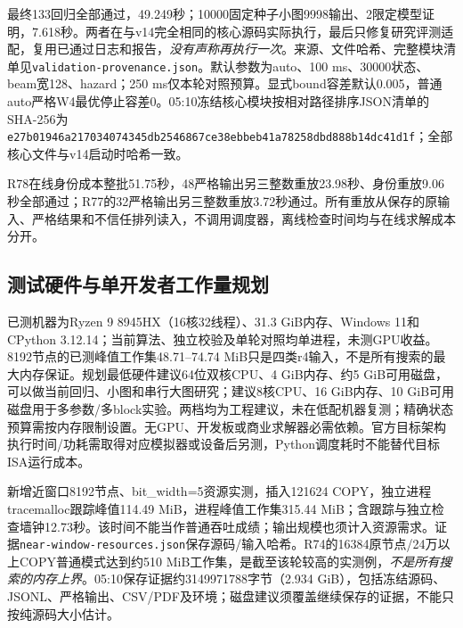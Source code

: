 \documentclass[UTF8,11pt,fontset=fandol]{ctexart}
\begin{document}
最终133回归全部通过，49.249秒；10000固定种子小图9998输出、2限定模型证明，7.618秒。两者在与v14完全相同的核心源码实际执行，最后只修复研究评测适配，复用已通过日志和报告，\emph{没有声称再执行一次}。来源、文件哈希、完整模块清单见\texttt{validation-provenance.json}。默认参数为auto、100 ms、30000状态、beam宽128、hazard；250 ms仅本轮对照预算。显式bound容差默认0.005，普通auto严格W4最优停止容差0。05:10冻结核心模块按相对路径排序JSON清单的SHA-256为\texttt{e27b01946a217034074345db2546867ce}\allowbreak\texttt{38ebbeb41a78258dbd888b14dc41d1f}；全部核心文件与v14启动时哈希一致。

R78在线身份成本整批51.75秒，48严格输出另三整数重放23.98秒、身份重放9.06秒全部通过；R77的32严格输出另三整数重放3.72秒通过。所有重放从保存的原输入、严格结果和不信任排列读入，不调用调度器，离线检查时间均与在线求解成本分开。

\subsection{测试硬件与单开发者工作量规划}
已测机器为Ryzen 9 8945HX（16核32线程）、31.3 GiB内存、Windows 11和CPython 3.12.14；当前算法、独立校验及单轮对照均单进程，未测GPU收益。8192节点的已测峰值工作集48.71--74.74 MiB只是四类r4输入，不是所有搜索的最大内存保证。规划最低硬件建议64位双核CPU、4 GiB内存、约5 GiB可用磁盘，可以做当前回归、小图和串行大图研究；建议8核CPU、16 GiB内存、10 GiB可用磁盘用于多参数/多block实验。两档均为工程建议，未在低配机器复测；精确状态预算需按内存限制设置。无GPU、开发板或商业求解器必需依赖。官方目标架构执行时间/功耗需取得对应模拟器或设备后另测，Python调度耗时不能替代目标ISA运行成本。

新增近窗口8192节点、bit\_width=5资源实测，插入121624 COPY，独立进程tracemalloc跟踪峰值114.49 MiB，进程峰值工作集315.44 MiB；含跟踪与独立检查墙钟12.73秒。该时间不能当作普通吞吐成绩；输出规模也须计入资源需求。证据\texttt{near-window-resources.json}保存源码/输入哈希。R74的16384原节点/24万以上COPY普通模式达到约510 MiB工作集，是截至该轮较高的实测例，\emph{不是所有搜索的内存上界}。05:10保存证据约3149971788字节（2.934 GiB），包括冻结源码、JSONL、严格输出、CSV/PDF及环境；磁盘建议须覆盖继续保存的证据，不能只按纯源码大小估计。
\end{document}
